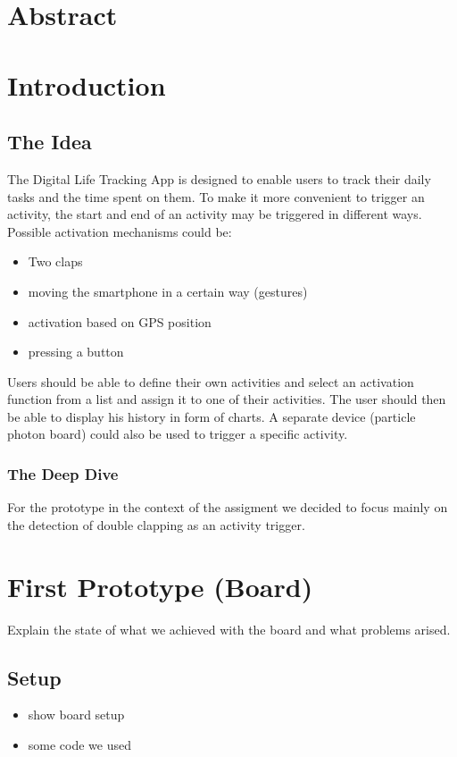\documentclass
[
 12pt, %
       DIV12,
       a4paper,
       oneside,
       titlepage,
       parskip=half,
       headings=normal,
       listof=totoc,
       bibliography=totoc,
       index=totoc,
       captions=tableheading,
       ]{scrreprt}
\author{Dennis Müller}
\date{\today}
\title{}
\begin{document}
\tableofcontents


\chapter{Abstract}
\label{sec:org2c9ed28}
\chapter{Introduction}
\label{sec:orgd208c4b}
\section{The Idea}
\label{sec:org210bdc0}

The Digital Life Tracking App is designed to enable users to track their daily tasks and the time spent on them.
To make it more convenient to trigger an activity, the start and end of an activity may be triggered in different ways. 
Possible activation mechanisms could be:
\begin{itemize}
\item Two claps
\item moving the smartphone in a certain way (gestures)
\item activation based on GPS position
\item pressing a button
\end{itemize}

Users should be able to define their own activities and select an activation function from a list and assign it to one of their activities.
The user should then be able to display his history in form of charts.
A separate device (particle photon board) could also be used to trigger a specific activity.

\subsection{The Deep Dive}
\label{sec:org86b9b52}
For the prototype in the context of the assigment we decided to focus mainly on the detection of double clapping as an activity trigger.



\chapter{First Prototype (Board)}
\label{sec:orge6ac6ca}
Explain the state of what we achieved with the board and what problems arised.
\section{Setup}
\label{sec:org493528f}
\begin{itemize}
\item show board setup
\item some code we used
\end{itemize}
\end{document}
